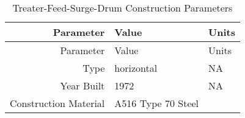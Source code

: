 \documentclass[10pt,parskip=half,
toc=sectionentrywithdots,
bibliography=totocnumbered,
captions=tableheading,numbers=noendperiod]{scrartcl}
\begin{document}
\begin{longtable}[]{@{}rll@{}}
\caption{Treater-Feed-Surge-Drum Construction Parameters \cite{PES2019}
\label{tbl:tbl_tank}}\tabularnewline
\toprule
\begin{minipage}[b]{0.23\columnwidth}\raggedleft
Parameter\strut
\end{minipage} & \begin{minipage}[b]{0.23\columnwidth}\raggedright
Value\strut
\end{minipage} & \begin{minipage}[b]{0.23\columnwidth}\raggedright
Units\strut
\end{minipage}\tabularnewline
\midrule
\endfirsthead
\toprule
\begin{minipage}[b]{0.23\columnwidth}\raggedleft
Parameter\strut
\end{minipage} & \begin{minipage}[b]{0.23\columnwidth}\raggedright
Value\strut
\end{minipage} & \begin{minipage}[b]{0.23\columnwidth}\raggedright
Units\strut
\end{minipage}\tabularnewline
\midrule
\endhead
\begin{minipage}[t]{0.23\columnwidth}\raggedleft
Type\strut
\end{minipage} & \begin{minipage}[t]{0.23\columnwidth}\raggedright
horizontal\strut
\end{minipage} & \begin{minipage}[t]{0.23\columnwidth}\raggedright
NA\strut
\end{minipage}\tabularnewline
\begin{minipage}[t]{0.23\columnwidth}\raggedleft
Year Built\strut
\end{minipage} & \begin{minipage}[t]{0.23\columnwidth}\raggedright
1972\strut
\end{minipage} & \begin{minipage}[t]{0.23\columnwidth}\raggedright
NA\strut
\end{minipage}\tabularnewline
\begin{minipage}[t]{0.23\columnwidth}\raggedleft
Construction Material\strut
\end{minipage} & \begin{minipage}[t]{0.23\columnwidth}\raggedright
A516 Type 70 Steel\strut
\end{minipage} & \begin{minipage}[t]{0.23\columnwidth}\raggedright

\end{minipage}
\end{longtable}
\end{document}
